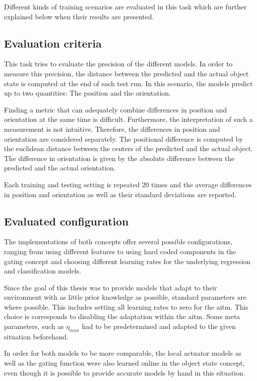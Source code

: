 Different kinds of training scenarios are evaluated in this task which are further explained below when their results are presented.


\subsection{Evaluation criteria}

This task tries to evaluate the precision of the different models. In order to measure this precision, the distance between the predicted and the actual object state is computed at the end of each test run.
In this scenario, the models predict up to two quantities: The position and the orientation. 

Finding a metric that can adequately combine differences in position and orientation at the same time is difficult. Furthermore, the interpretation of such a measurement is not intuitive. Therefore, the differences in position and orientation are considered separately. 
The positional difference is computed by the euclidean distance between the centers of the predicted and the actual object. The difference in orientation is given by the absolute difference between the predicted and the actual orientation.

Each training and testing setting is repeated 20 times and the average differences in position and orientation as well as their standard deviations are reported. 

\subsection{Evaluated configuration}
The implementations of both concepts offer several possible configurations, ranging from using different features to using hard coded components in the gating concept and choosing different learning rates for the underlying regression and classification models. 

Since the goal of this thesis was to provide models that adapt to their environment with as little prior knowledge as possible, standard parameters are where possible. This includes setting all learning rates to zero for the \gls{aitm}. This choice is corresponds to disabling the adaptation within the \gls{aitm}.
Some meta parameters, such as $\eta_{max}$ had to be predetermined and adapted to the given situation beforehand.

In order for both models to be more comparable, the local actuator models as well as the gating function were also learned online in the object state concept, even though it is possible to provide accurate models by hand in this situation.

